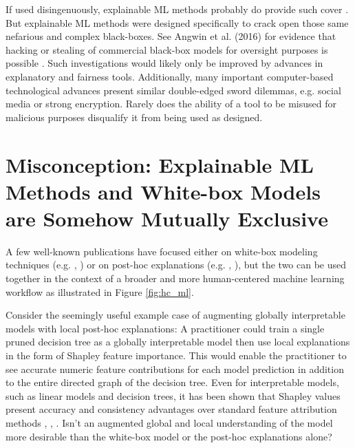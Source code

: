 \documentclass[fleqn]{article}
\begin{document}
If used disingenuously, explainable ML methods probably do provide such cover \cite{fair_washing}. But explainable ML methods were designed specifically to crack open those same nefarious and complex black-boxes. See Angwin et al. (2016) for evidence that hacking or stealing of commercial black-box models for oversight purposes is possible \cite{angwin16}. Such investigations would likely only be improved by advances in explanatory and fairness tools. Additionally, many important computer-based technological advances present similar double-edged sword dilemmas, e.g. social media or strong encryption. Rarely does the ability of a tool to be misused for malicious purposes disqualify it from being used as designed. 

\section{Misconception: Explainable ML Methods and White-box Models are Somehow Mutually Exclusive} \label{sec:white_box}

A few well-known publications have focused either on white-box modeling techniques (e.g. \cite{slim}, \cite{sbrl}) or on post-hoc explanations (e.g. \cite{lime}, \cite{shapley}), but the two can be used together in the context of a broader and more human-centered machine learning workflow as illustrated in Figure \ref{fig:hc_ml}. 

Consider the seemingly useful example case of augmenting globally interpretable models with local post-hoc explanations: A practitioner could train a single pruned decision tree as a globally interpretable model then use local explanations in the form of Shapley feature importance. This would enable the practitioner to see accurate numeric feature contributions for each model prediction in addition to the entire directed graph of the decision tree. Even for interpretable models, such as linear models and decision trees, it has been shown that Shapley values present accuracy and consistency advantages over standard feature attribution methods \cite{lipovetsky2001analysis}, \cite{tree_shap}, \cite{shapley}. Isn't an augmented global and local understanding of the model more desirable than the white-box model or the post-hoc explanations alone?\\ 

\end{document}
